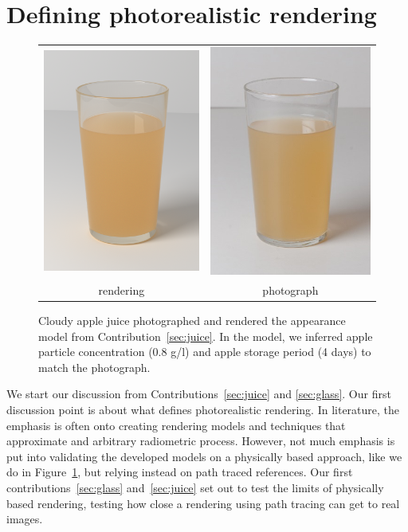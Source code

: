 \section{Defining photorealistic rendering}
\label{sec:definingphoto}
\begin{figure}[t]
\centering
\begin{tabular}{@{}c@{}c@{}}
	 \includegraphics[width=0.4\columnwidth]{figures/teaser_render.png} &
	 \includegraphics[width=0.4\columnwidth]{figures/ref_img.jpg}  \\
	rendering & photograph \\
\end{tabular}
\caption{Cloudy apple juice photographed and rendered the appearance model from Contribution~\ref{sec:juice}. In the model, we inferred apple particle concentration (0.8 g/l) and apple storage period (4 days) to match the photograph.} %
\label{fig:juicecomparison}
\end{figure}

We start our discussion from Contributions~\ref{sec:juice} and \ref{sec:glass}. Our first discussion point is about what defines photorealistic rendering. In literature, the emphasis is often onto creating rendering models and techniques that approximate and arbitrary radiometric process. However, not much emphasis is put into validating the developed models on a physically based approach, like we do in Figure~\ref{fig:juicecomparison}, but relying instead on path traced references. Our first contributions~\ref{sec:glass} and~\ref{sec:juice} set out to test the limits of physically based rendering, testing how close a rendering using path tracing can get to real images. 


